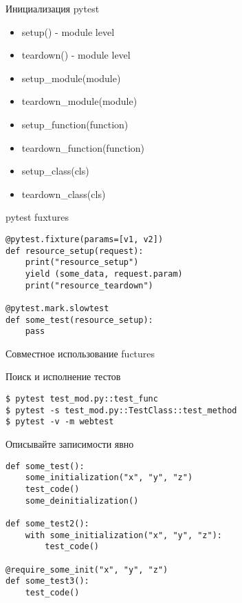 \documentclass{article}
\begin{document}
\begin{center}Инициализация pytest\end{center}
\begin{itemize}
	\item setup() - module level
    \item teardown() - module level
	\item setup\_module(module)
    \item teardown\_module(module)
    \item setup\_function(function)
    \item teardown\_function(function)
    \item setup\_class(cls)
    \item teardown\_class(cls)
\end{itemize}
\newpage

\begin{center}pytest fuxtures\end{center}
\begin{lstlisting}
@pytest.fixture(params=[v1, v2])
def resource_setup(request):
    print("resource_setup")
    yield (some_data, request.param)
    print("resource_teardown")

@pytest.mark.slowtest
def some_test(resource_setup):
    pass
\end{lstlisting}
Совместное использование fuctures
\newpage

\begin{center}Поиск и исполнение тестов\end{center}
\begin{lstlisting}
$ pytest test_mod.py::test_func
$ pytest -s test_mod.py::TestClass::test_method
$ pytest -v -m webtest
\end{lstlisting}
\newpage

\begin{center}Описывайте записимости явно\end{center}
\begin{lstlisting}
def some_test():
    some_initialization("x", "y", "z")
    test_code()
    some_deinitialization()

def some_test2():
    with some_initialization("x", "y", "z"):
        test_code()

@require_some_init("x", "y", "z")
def some_test3():
    test_code()
\end{lstlisting}
\newpage
\end{document}
